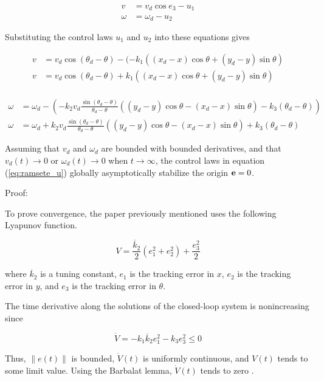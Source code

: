 \begin{align*}
  v &= v_d\cos e_3 - u_1 \\
  \omega &= \omega_d - u_2
\end{align*}

Substituting the control laws $u_1$ and $u_2$ into these equations gives

\begin{align*}
  v &= v_d\cos(\theta_d - \theta) -
    (-k_1 ((x_d - x) \cos\theta + (y_d - y) \sin\theta) \\
  v &= v_d\cos(\theta_d - \theta) +
    k_1 ((x_d - x) \cos\theta + (y_d - y) \sin\theta) \\
\end{align*}

\begin{align*}
  \omega &= \omega_d -
    \left(-k_2 v_d \frac{\sin(\theta_d - \theta)}{\theta_d - \theta}
    ((y_d - y) \cos\theta - (x_d - x) \sin\theta) -
      k_3 (\theta_d - \theta)\right) \\
  \omega &= \omega_d + k_2 v_d \frac{\sin(\theta_d - \theta)}{\theta_d - \theta}
    ((y_d - y) \cos\theta - (x_d - x) \sin\theta) + k_3 (\theta_d - \theta)
\end{align*}

\begin{theorem}
  Assuming that $v_d$ and $\omega_d$ are bounded with bounded derivatives, and
  that $v_d(t) \rightarrow 0$ or $\omega_d(t) \rightarrow 0$ when
  $t \rightarrow \infty$, the control laws in equation (\ref{eq:ramsete_u})
  globally asymptotically stabilize the origin $\mathbf{e} = 0$.

  Proof:

  To prove convergence, the paper previously mentioned uses the following
  Lyapunov function.

  \begin{equation*}
    V = \frac{\overline{k}_2}{2}(e_1^2 + e_2^2) + \frac{e_3^2}{2}
  \end{equation*}

  where $\overline{k}_2$ is a tuning constant, $e_1$ is the tracking error in
  $x$, $e_2$ is the tracking error in $y$, and $e_3$ is the tracking error in
  $\theta$.

  The time derivative along the solutions of the closed-loop \gls{system} is
  nonincreasing since

  \begin{equation*}
    \dot{V} = -k_1 \overline{k}_2 e_1^2 - k_3 e_3^2 \leq 0
  \end{equation*}

  Thus, $\lVert e(t) \rVert$ is bounded, $\dot{V}(t)$ is uniformly continuous,
  and $V(t)$ tends to some limit value. Using the Barbalat lemma, $\dot{V}(t)$
  tends to zero \cite{bib:ctrl_wheeled_mobile_robots}.
\end{theorem}

